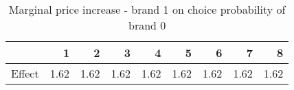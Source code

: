\begin{table}[ht]
\centering
\begin{tabular}{rrrrrrrrr}
  \hline
 & 1 & 2 & 3 & 4 & 5 & 6 & 7 & 8 \\ 
  \hline
Effect & 1.62 & 1.62 & 1.62 & 1.62 & 1.62 & 1.62 & 1.62 & 1.62 \\ 
   \hline
\end{tabular}
\caption{Marginal price increase - brand 1 on choice probability of brand 0} 
\label{tab:mg2c}
\end{table}
